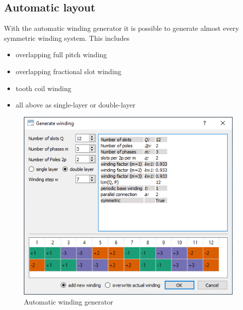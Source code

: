 \documentclass[]{scrreprt}
\begin{document}
\subsection{Automatic layout}
With the automatic winding generator it is possible to generate almost every symmetric winding system.
This includes
\begin{itemize}
 \item overlapping full pitch winding
 \item overlapping fractional slot winding
 \item tooth coil winding
 \item all above as single-layer or double-layer
\end{itemize}
%
\begin{figure}[htpb]
    \centering
    \includegraphics[width=0.99\textwidth,angle=0]{fig/auto_winding}
    \caption{Automatic winding generator }
    \label{fig:auto_winding}
\end{figure}
%
%
\end{document}
